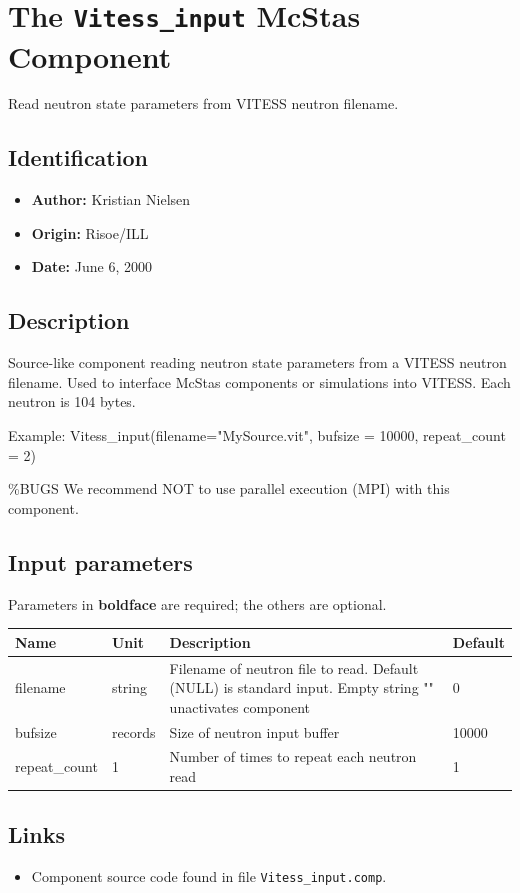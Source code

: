 \section{The \texttt{Vitess\_input} McStas Component}
Read neutron state parameters from VITESS neutron filename.

\subsection*{Identification}
\begin{itemize}
  \item \textbf{Author:} Kristian Nielsen
  \item \textbf{Origin:} Risoe/ILL
  \item \textbf{Date:} June 6, 2000
\end{itemize}

\subsection*{Description}
Source-like component reading neutron state parameters from a VITESS neutron filename. Used to interface McStas components or simulations into VITESS. Each neutron is 104 bytes.

Example: Vitess\_input(filename="MySource.vit", bufsize = 10000, repeat\_count = 2)

\%BUGS We recommend NOT to use parallel execution (MPI) with this component.

\subsection*{Input parameters}
Parameters in \textbf{boldface} are required; the others are optional.

\begin{longtable}{p{}p{}p{}p{}}
\toprule
\textbf{Name} & \textbf{Unit} & \textbf{Description} & \textbf{Default} \\
\midrule
\endhead
filename & string & Filename of neutron file to read. Default (NULL) is standard input. Empty string "" unactivates component & 0 \\
bufsize & records & Size of neutron input buffer & 10000 \\
repeat\_count & 1 & Number of times to repeat each neutron read & 1 \\
\bottomrule
\end{longtable}

\subsection*{Links}
\begin{itemize}
  \item Component source code found in file \texttt{Vitess\_input.comp}.
\end{itemize}
